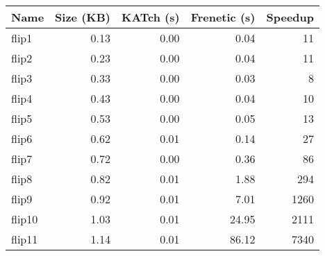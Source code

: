 \begin{tabular}{lrrrr}
\toprule
Name & Size (KB) & KATch (s) & Frenetic (s) & Speedup \\
\midrule
flip1 & 0.13 & 0.00 & 0.04 & 11 \\
flip2 & 0.23 & 0.00 & 0.04 & 11 \\
flip3 & 0.33 & 0.00 & 0.03 & 8 \\
flip4 & 0.43 & 0.00 & 0.04 & 10 \\
flip5 & 0.53 & 0.00 & 0.05 & 13 \\
flip6 & 0.62 & 0.01 & 0.14 & 27 \\
flip7 & 0.72 & 0.00 & 0.36 & 86 \\
flip8 & 0.82 & 0.01 & 1.88 & 294 \\
flip9 & 0.92 & 0.01 & 7.01 & 1260 \\
flip10 & 1.03 & 0.01 & 24.95 & 2111 \\
flip11 & 1.14 & 0.01 & 86.12 & 7340 \\
\bottomrule
\end{tabular}
